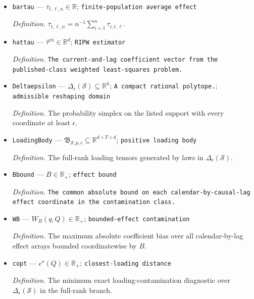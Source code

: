\documentclass{article}
\begin{document}
\begin{itemize}
  \par\smallskip\noindent\emph{Definition.} \texttt{The unit-\allowbreak{},\allowbreak{} calendar-\allowbreak{},\allowbreak{} and causal-\allowbreak{}lag-\allowbreak{}specific mean effect in the published sampling layer.}
  \item \texttt{bartau} --- \(\overline\tau_{t,\ell,n}\in\mathbb R\); \texttt{finite-\allowbreak{}population average effect}
  \par\smallskip\noindent\emph{Definition.} \(\overline\tau_{t,\ell,n}=n^{-1}\sum_{i=1}^{n}\tau_{i,t,\ell}\).
  \item \texttt{hattau} --- \(\widehat\tau^{\mathrm{ex}}\in\mathbb R^d\); \texttt{RIPW estimator}
  \par\smallskip\noindent\emph{Definition.} \texttt{The current-\allowbreak{}and-\allowbreak{}lag coefficient vector from the published-\allowbreak{}class weighted least-\allowbreak{}squares problem.}
  \item \texttt{Deltaepsilon} --- \(\Delta_{\epsilon}(\mathcal S)\subseteq\mathbb R^k\); \texttt{A compact rational polytope.}; \texttt{admissible reshaping domain}
  \par\smallskip\noindent\emph{Definition.} The probability simplex on the listed support with every coordinate at least \(\epsilon\).
  \item \texttt{LoadingBody} --- \(\mathfrak B_{\mathcal S,p,\epsilon}\subseteq\mathbb R^{d\times T\times d}\); \texttt{positive loading body}
  \par\smallskip\noindent\emph{Definition.} The full-rank loading tensors generated by laws in \(\Delta_{\epsilon}(\mathcal S)\).
  \item \texttt{Bbound} --- \(B\in\mathbb R_+\); \texttt{effect bound}
  \par\smallskip\noindent\emph{Definition.} \texttt{The common absolute bound on each calendar-\allowbreak{}by-\allowbreak{}causal-\allowbreak{}lag effect coordinate in the contamination class.}
  \item \texttt{WB} --- \(W_B(q,Q)\in\mathbb R_+\); \texttt{bounded-\allowbreak{}effect contamination}
  \par\smallskip\noindent\emph{Definition.} The maximum absolute coefficient bias over all calendar-by-lag effect arrays bounded coordinatewise by \(B\).
  \item \texttt{copt} --- \(c^{\star}(Q)\in\mathbb R_+\); \texttt{closest-\allowbreak{}loading distance}
  \par\smallskip\noindent\emph{Definition.} The minimum exact loading-contamination diagnostic over \(\Delta_{\epsilon}(\mathcal S)\) in the full-rank branch.
\end{itemize}
\end{document}
